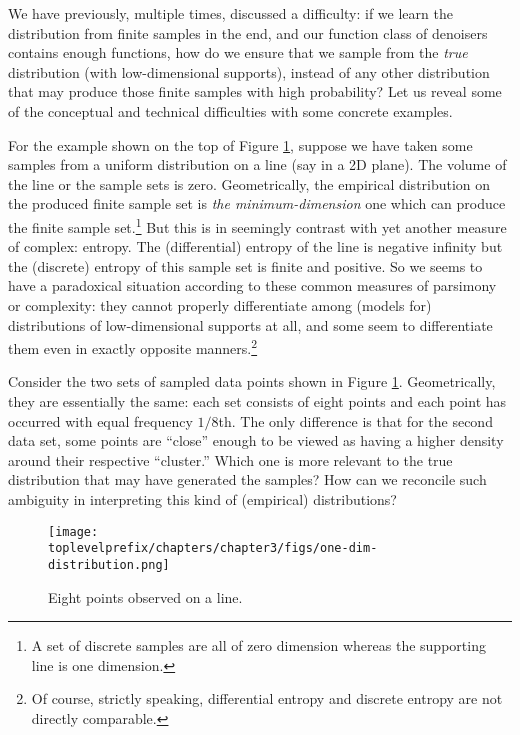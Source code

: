 \documentclass[../../book-main.tex]{subfiles}
\begin{document}
We have previously, multiple times, discussed a difficulty: if we learn the distribution from finite samples in the end, and our function class of denoisers contains enough functions, how do we ensure that we sample from the \textit{true} distribution (with low-dimensional supports), instead of any other distribution that may produce those finite samples with high probability? Let us reveal some of the conceptual and technical difficulties with some concrete examples.

\begin{example}\label{eg:measures-of-complexity}
For the example shown on the top of Figure \ref{fig:1d-line}, suppose we have taken some samples from a uniform distribution on a line (say in a 2D plane). The volume of the line or the sample sets is zero. 
Geometrically, the empirical distribution on the produced finite sample set is {\em the minimum-dimension} one which can produce  the finite sample set.\footnote{A set of discrete samples are all of zero dimension whereas the supporting line is one dimension.} But this is in seemingly contrast with yet another measure of complex: entropy. The (differential) entropy of the line is negative infinity but the (discrete) entropy of this sample set is finite and positive. So we seems to have a paradoxical situation according to these common measures of parsimony or complexity: they cannot properly differentiate among (models for) distributions of low-dimensional supports at all, and some seem to differentiate them even in exactly opposite manners.\footnote{Of course, strictly speaking, differential entropy and discrete entropy are not directly comparable.}
\end{example}

\begin{example}[Density]\label{eg:density} Consider the two sets of sampled data points shown in Figure \ref{fig:1d-line}. Geometrically, they are essentially the same: each set consists of eight points and each point has occurred with equal frequency $1/8$th. The only difference is that for the second data set, some points are ``close'' enough to be viewed as having a higher density around their respective ``cluster.'' Which one is more relevant to the true distribution that may have generated the samples? How can we reconcile such ambiguity in interpreting this kind of (empirical) distributions?
\begin{figure}[t]
	\centering
	\texttt{[image: \\toplevelprefix/chapters/chapter3/figs/one-dim-distribution.png]}
	\caption{Eight points observed on a line.}
	\label{fig:1d-line}
\end{figure}
\end{example}
\end{document}

